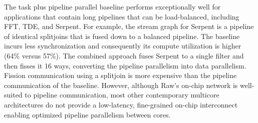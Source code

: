 The task plus pipeline parallel baseline performs exceptionally well
for applications that contain long pipelines that can be
load-balanced, including FFT, TDE, and Serpent.  For example, the
stream graph for Serpent is a pipeline of identical splitjoins that is
fused down to a balanced pipeline.  The baseline incurs less
synchronization and consequently its compute utilization is higher
(64\% versus 57\%).  The combined approach fuses Serpent to a single
filter and then fisses it 16 ways, converting the pipeline parallelism
into data parallelism.  Fission communication using a splitjoin is
more expensive than the pipeline communication of the baseline.
However, although Raw's on-chip network is well-suited to pipeline
communication, most other contemporary multicore architectures do not
provide a low-latency, fine-grained on-chip interconnect enabling
optimized pipeline parallelism between cores.







